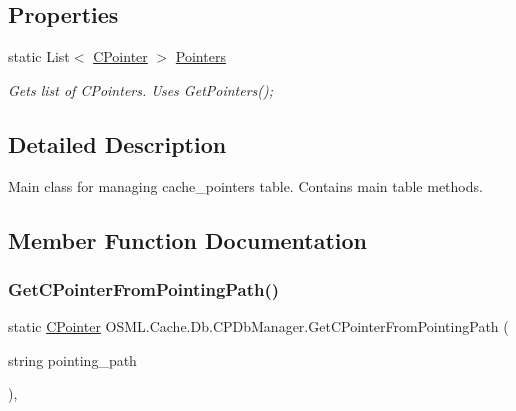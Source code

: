 \subsection*{Properties}
\begin{DoxyCompactItemize}
\item 
static List$<$ \mbox{\hyperlink{classOSML_1_1Cache_1_1CPointer}{C\+Pointer}} $>$ \mbox{\hyperlink{classOSML_1_1Cache_1_1Db_1_1CPDbManager_adabfcee3456023de52c6984935bf1c86}{Pointers}}
\begin{DoxyCompactList}\small\item\em Gets list of C\+Pointers. Uses Get\+Pointers(); \end{DoxyCompactList}\end{DoxyCompactItemize}


\subsection{Detailed Description}
Main class for managing cache\+\_\+pointers table. Contains main table methods. 



\subsection{Member Function Documentation}
\mbox{\label{classOSML_1_1Cache_1_1Db_1_1CPDbManager_a795e89a6f96f96feb2fab051817005d3}} 
\subsubsection{\texorpdfstring{GetCPointerFromPointingPath()}{GetCPointerFromPointingPath()}}
{\footnotesize\ttfamily static \mbox{\hyperlink{classOSML_1_1Cache_1_1CPointer}{C\+Pointer}} O\+S\+M\+L.\+Cache.\+Db.\+C\+P\+Db\+Manager.\+Get\+C\+Pointer\+From\+Pointing\+Path (\begin{DoxyParamCaption}\item[{string}]{pointing\+\_\+path }\end{DoxyParamCaption})\hspace{0.3cm}{\ttfamily [inline]}, {\ttfamily [static]}}



